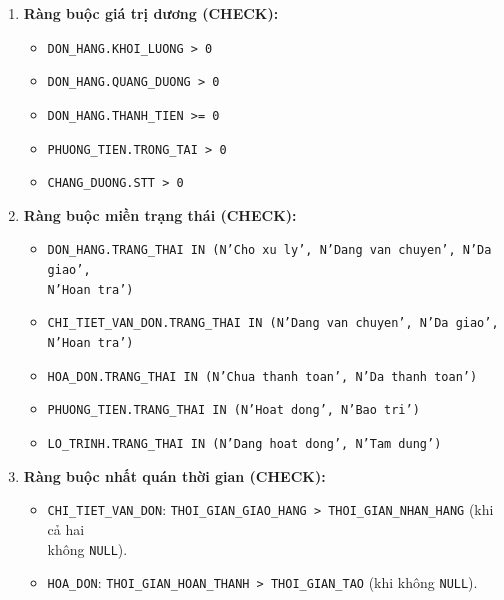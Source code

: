 \documentclass[11pt]{report}
\begin{document}
\begin{enumerate}
    \item \textbf{Ràng buộc giá trị dương (CHECK):}
    \begin{itemize}
        \item \texttt{DON\_HANG.KHOI\_LUONG > 0}
        
        \item \texttt{DON\_HANG.QUANG\_DUONG > 0}
        
        \item \texttt{DON\_HANG.THANH\_TIEN >= 0}
        
        \item \texttt{PHUONG\_TIEN.TRONG\_TAI > 0}
        
        \item \texttt{CHANG\_DUONG.STT > 0}
    \end{itemize}

    \item \textbf{Ràng buộc miền trạng thái (CHECK):}
    \begin{itemize}
        \item \texttt{DON\_HANG.TRANG\_THAI IN (N'Cho xu ly', N'Dang van chuyen', N'Da giao',\\
              N'Hoan tra')}
        \item \texttt{CHI\_TIET\_VAN\_DON.TRANG\_THAI IN (N'Dang van chuyen', N'Da giao',\\
              N'Hoan tra')}
        \item \texttt{HOA\_DON.TRANG\_THAI IN (N'Chua thanh toan', N'Da thanh toan')}
        
        \item \texttt{PHUONG\_TIEN.TRANG\_THAI IN (N'Hoat dong', N'Bao tri')}
        
        \item \texttt{LO\_TRINH.TRANG\_THAI IN (N'Dang hoat dong', N'Tam dung')}
    \end{itemize}

    \item \textbf{Ràng buộc nhất quán thời gian (CHECK):}
    \begin{itemize}
        \item \texttt{CHI\_TIET\_VAN\_DON}: \texttt{THOI\_GIAN\_GIAO\_HANG > THOI\_GIAN\_NHAN\_HANG} (khi cả hai \\
              không \texttt{NULL}).
        \item \texttt{HOA\_DON}: \texttt{THOI\_GIAN\_HOAN\_THANH > THOI\_GIAN\_TAO} (khi không \texttt{NULL}).
    \end{itemize}


\end{enumerate}
\end{document}
